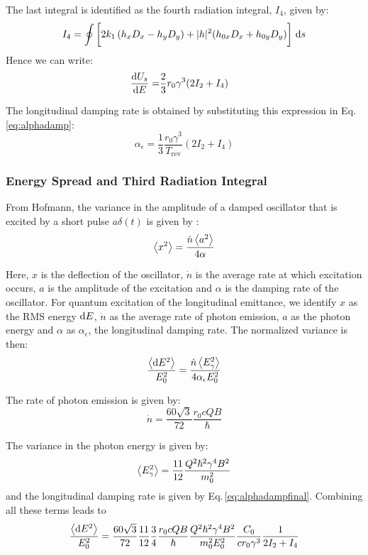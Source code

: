 The last integral is identified as the fourth radiation integral, $I_4$, given by:
\begin{equation}
    I_4 = \oint \bigg[2k_1 \left( h_x D_x - h_y D_y \right) + |h|^2 (h_{0x}D_x + h_{0y} D_y)\bigg] \ \text{d} s
\end{equation}
Hence we can write:
\begin{align}
    \frac{\text{d} {U_s}}{\text{d} {E}} = &\frac{2}{3} r_0 \gamma^3 (2I_2 + I_4 )
\end{align}

The longitudinal damping rate is obtained by substituting this expression in Eq.\,\eqref{eq:alphadamp}:
\begin{equation}
    \alpha_\epsilon =
      \frac{1}{3} \frac{r_0 \gamma^3}{T_\text{rev}} (2I_2 + I_4 )
    \label{eq:alphadampfinal}
\end{equation}


\subsubsection{Energy Spread and Third Radiation Integral}
\label{sec:enespreadandi3}

From Hofmann, the variance in the amplitude of a damped oscillator that is excited by a short pulse $a\delta(t)$ is given by \cite{hofmann_2004}:
\begin{equation}
    \left\langle {x^2} \right\rangle = \frac{\dot{n} \left\langle {a^2} \right\rangle}{4\alpha}
\end{equation}

Here, $x$ is the deflection of the oscillator, $\dot{n}$ is the average rate at which excitation occurs, $a$ is the amplitude of the excitation and $\alpha$ is the damping rate of the oscillator. For quantum excitation of the longitudinal emittance, we identify $x$ as the RMS energy $\text{d} E$, $\dot{n}$ as the average rate of photon emission, $a$ as the photon energy and $\alpha$ as $\alpha_\epsilon$, the longitudinal damping rate. The normalized variance is then:
\begin{equation}
    \frac{\left\langle {\text{d}E^2} \right\rangle}{E_0^2} = \frac{\dot{n} \left\langle {E_\gamma^2} \right\rangle}{4 \alpha_\epsilon E_0^2}
    \label{eq:notreallycampbell}
\end{equation}

The rate of photon emission is given by:
\begin{equation}
    \dot{n} = \frac{60 \sqrt{3}}{72} \frac{r_0 c Q B}{\hbar}
\end{equation}

The variance in the photon energy is given by:
\begin{equation}
    \left\langle {E_\gamma^2} \right\rangle = \frac{11}{12} \frac{Q^2\hbar^2 \gamma^4 B^2}{m_0^2}
\end{equation}
and the longitudinal damping rate is given by Eq.\,\eqref{eq:alphadampfinal}.
Combining all these terms leads to
\begin{equation}
    \frac{\left\langle {\text{d}E^2} \right\rangle}{E_0^2} = \frac{60 \sqrt{3}}{72} \frac{11}{12} \frac{3}{4} \frac{r_0 c Q B}{\hbar} \frac{Q^2\hbar^2 \gamma^4 B^2}{m_0^2 E_0^2} \frac{C_0}{c r_0 \gamma^3} \frac{1}{2I_2 + I_4}
\end{equation}

